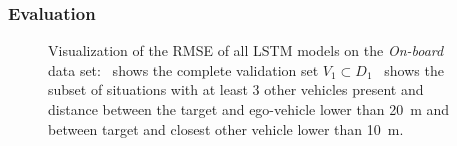 \subsubsection{Evaluation}%
\label{ssubsec:evaluation_lstms}

\begin{figure}[t!]
	\centering
    \caption{Visualization of the \ac{RMSE} of all \ac{LSTM} models on the \emph{On-board} data set:~\protect{} shows the complete validation set $V_1 \subset D_1$~\protect{} shows the subset of situations with at least \num{3} other vehicles present and distance between the target and ego-vehicle lower than  \SI{20}{\meter} and between target and closest other vehicle lower than \SI{10}{\meter}.}\label{fig:rmse_on_board_all}
\end{figure}

